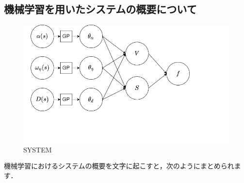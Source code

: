 \documentclass[11pt]{jsarticle}
\begin{document}
		\subsection{機械学習を用いたシステムの概要について}
			\begin{figure}[h!]
				\centering
				\includegraphics[scale=0.5]{./figure/systems.png}
				\caption{SYSTEM}
			\end{figure}
			機械学習におけるシステムの概要を文字に起こすと，次のようにまとめられます．
\end{document}
